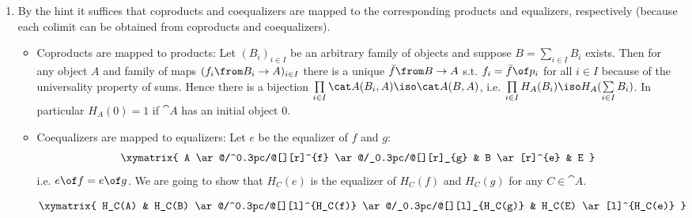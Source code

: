 \begin{answer}
  \begin{enumerate}
  \item
    By the hint it suffices that coproducts and coequalizers are mapped to the corresponding products and equalizers, respectively (because each colimit can be obtained from coproducts and coequalizers).
    \begin{itemize}
    \item Coproducts are mapped to products: Let $(B_i)_{i\in I}$ be an arbitrary family of objects and suppose $B=\sum\limits_{i\in I}B_i$ exists. Then for any object $A$ and family of maps $(f_i\from B_i\to A)_{i\in I}$ there is a unique $\bar f\from B\to A$ s.t. $f_i=\bar f\of p_i$ for all $i\in I$ because of the universality property of sums. Hence there is a bijection $\prod\limits_{i\in I} \cat A(B_i,A)\iso \cat A(B,A)$, i.e. $\prod\limits_{i\in I}H_A(B_i)\iso H_A(\sum\limits_{i\in I}B_i)$. In particular $H_A(0)=1$ if $\cat A$ has an initial object $0$.
    \item Coequalizers are mapped to equalizers: Let $e$ be the equalizer of $f$ and $g$:
      \begin{align*}
        \xymatrix{
  A \ar@/^0.3pc/@[][r]^{f} \ar@/_0.3pc/@[][r]_{g} & B  \ar[r]^{e} & E
                                                       } 
      \end{align*}
      i.e. $e\of f=e\of g$. We are going to show that $H_C(e)$ is the equalizer of $H_C(f)$ and $H_C(g)$ for any $C\in\cat A$. 

      \begin{align*}
        \xymatrix{
  H_C(A) & H_C(B) \ar@/^0.3pc/@[][l]^{H_C(f)} \ar@/_0.3pc/@[][l]_{H_C(g)}  & H_C(E) \ar[l]^{H_C(e)}
                                                       } 
      \end{align*}


\end{itemize}
\end{enumerate}
\end{answer}
